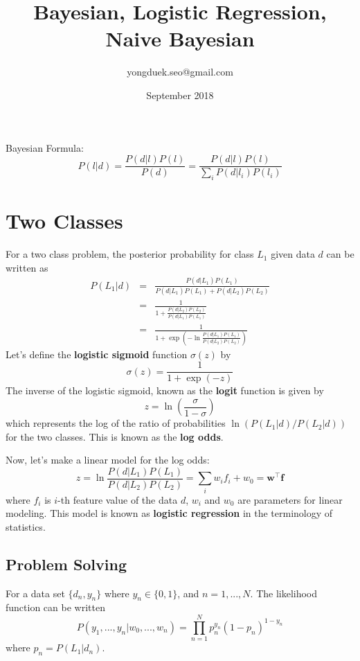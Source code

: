 \documentclass{article}
\title{Bayesian, Logistic Regression, Naive Bayesian}
\author{yongduek.seo@gmail.com}
\date{September 2018}
\begin{document}
\maketitle

Bayesian Formula:
\begin{equation}
    P(l | d) = \frac{P(d|l)P(l)}{P(d)} = \frac{P(d|l)P(l)}{\sum_i P(d|l_i) P(l_i)}
\end{equation}

\section{Two Classes}
For a two class problem, the posterior probability for class $L_1$ given data $d$ can be written as 
\begin{eqnarray} 
    P(L_1 | d) 
    & = & \frac{P(d | L_1) P(L_1) }{ P(d|L_1)P(L_1) + P(d|L_2)P(L_2)} \\
    & = & \frac{1}{  1 + \frac{P(d|L_2)P(L_2)}{P(d|L_1)P(L_1)} } \\
    & = & \frac{1 }{ 1 + \exp\left( -\ln \frac{P(d|L_1)P(L_1)}{P(d|L_2)P(L_2)} \right) }
\end{eqnarray}
Let's define the {\bf logistic sigmoid} function $\sigma(z)$ by
\begin{equation}
    \sigma(z) = \frac{1}{1 + \exp (-z) }
\end{equation}
The inverse of the logistic sigmoid, known as the {\bf logit} function is given by
\begin{equation}
    z = \ln \left(\frac{\sigma}{1-\sigma}\right)
\end{equation}
which represents the log of the ratio of probabilities $\ln(P(L_1|d)/P(L_2|d))$ for the two classes. This is known as the {\bf log odds}.

Now, let's make a linear model for the log odds:
\begin{equation}
    z = \ln \frac{P(d|L_1)P(L_1)}{P(d|L_2)P(L_2)} = \sum_i w_i f_i + w_0 = \boldsymbol{w}^\top\boldsymbol{f}
\end{equation}
where $f_i$ is $i$-th feature value of the data $d$, $w_i$ and $w_0$ are parameters for linear modeling. This model is known as {\bf logistic regression} in the terminology of statistics.

\subsection{Problem Solving}
    For a data set $\{ d_n, y_n \}$ where $ y_n \in \{0, 1\} $, and $n=1,...,N$. The likelihood function can be written
    \begin{equation}
        P(y_1,...,y_n | w_0, ..., w_n) = \prod_{n=1}^N p_n^{y_n} (1-p_n)^{1-y_n}
    \end{equation}
    where $p_n = P(L_1|d_n)$.
    
\end{document}
